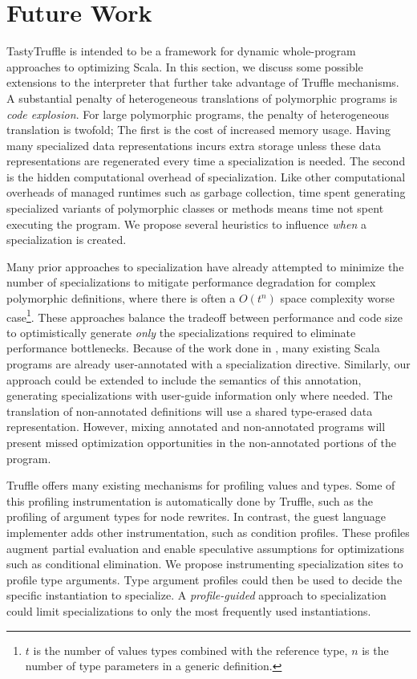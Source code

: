 \chapter{Future Work}

TastyTruffle is intended to be a framework for dynamic whole-program approaches to optimizing Scala.
In this section, we discuss some possible extensions to the interpreter that further take advantage of Truffle mechanisms.
A substantial penalty of heterogeneous translations of polymorphic programs is \textit{code explosion}.
For large polymorphic programs, the penalty of heterogeneous translation is twofold; 
The first is the cost of increased memory usage.
Having many specialized data representations incurs extra storage unless these data representations are regenerated every time a specialization is needed.
The second is the hidden computational overhead of specialization. 
Like other computational overheads of managed runtimes such as garbage collection, time spent generating specialized variants of polymorphic classes or methods means time not spent executing the program.
We propose several heuristics to influence \textit{when} a specialization is created.

Many prior approaches to specialization have already attempted to minimize the number of specializations to mitigate performance degradation for complex polymorphic definitions, where there is often a \(O(t^n)\) space complexity worse case\footnote{$t$ is the number of values types combined with the reference type, $n$ is the number of type parameters in a generic definition.}.
These approaches balance the tradeoff between performance and code size to optimistically generate \textit{only} the specializations required to eliminate performance bottlenecks.
Because of the work done in \cite{scala:specialization}, many existing Scala programs are already user-annotated with a specialization directive.
Similarly, our approach could be extended to include the semantics of this annotation, generating specializations with user-guide information only where needed.
The translation of non-annotated definitions will use a shared type-erased data representation.
However, mixing annotated and non-annotated programs will present missed optimization opportunities in the non-annotated portions of the program.

Truffle offers many existing mechanisms for profiling values and types.
Some of this profiling instrumentation is automatically done by Truffle, such as the profiling of argument types for node rewrites. In contrast, the guest language implementer adds other instrumentation,  such as condition profiles.
These profiles augment partial evaluation and enable speculative assumptions for optimizations such as conditional elimination.
We propose instrumenting specialization sites to profile type arguments.
Type argument profiles could then be used to decide the specific instantiation to specialize.
A \textit{profile-guided} approach to specialization could limit specializations to only the most frequently used instantiations.

